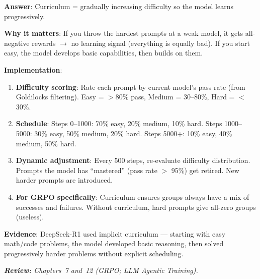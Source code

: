 \begin{questionbox}
\textbf{Answer}: Curriculum = gradually increasing difficulty so the model learns progressively.

\textbf{Why it matters}: If you throw the hardest prompts at a weak model, it gets all-negative rewards $\rightarrow$ no learning signal (everything is equally bad). If you start easy, the model develops basic capabilities, then builds on them.

\textbf{Implementation}:

\begin{enumerate}
  \item \textbf{Difficulty scoring}: Rate each prompt by current model’s pass rate (from Goldilocks filtering). Easy = $>$80\% pass, Medium = 30--80\%, Hard = $<$30\%.
  \item \textbf{Schedule}: Steps 0--1000: 70\% easy, 20\% medium, 10\% hard. Steps 1000--5000: 30\% easy, 50\% medium, 20\% hard. Steps 5000+: 10\% easy, 40\% medium, 50\% hard.
  \item \textbf{Dynamic adjustment}: Every 500 steps, re-evaluate difficulty distribution. Prompts the model has ``mastered'' (pass rate $>$ 95\%) get retired. New harder prompts are introduced.
  \item \textbf{For GRPO specifically}: Curriculum ensures groups always have a mix of successes and failures. Without curriculum, hard prompts give all-zero groups (useless).
\end{enumerate}

\textbf{Evidence}: DeepSeek-R1 used implicit curriculum --- starting with easy math/code problems, the model developed basic reasoning, then solved progressively harder problems without explicit scheduling.

\emph{\textbf{Review:} Chapters~7 and~12 (GRPO; LLM Agentic Training).}
\end{questionbox}

